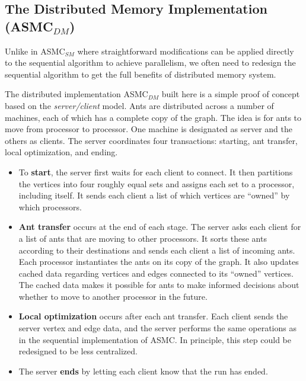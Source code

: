 \documentclass[11pt]{article}
\begin{document}
\subsection{The Distributed Memory Implementation (ASMC$_{DM}$)}\label{ASMC_dist} 

Unlike in ASMC$_{SM}$ where straightforward modifications can be applied directly to the sequential algorithm to achieve parallelism, we often need to redesign the sequential algorithm to get the full benefits of distributed memory system. 

The distributed implementation ASMC$_{DM}$ built here is a simple proof of concept based on the \textit{server/client} model.  Ants are distributed across a number of machines, each of which has a complete copy of the graph.  The idea is for ants to move from processor to processor.  One machine is designated as server and the others as clients.  The server coordinates four transactions: starting, ant transfer, local optimization, and ending.


\begin{itemize}

\item To {\bf start}, the server first waits for each client to connect.  It then partitions the vertices into four roughly equal sets and assigns each set to a processor, including itself.  It sends each client a list of which vertices are ``owned'' by which processors.

\item {\bf Ant transfer} occurs at the end of each stage.  The server asks each client for a list of ants that are moving to other processors.  It sorts these ants according to their destinations and sends each client a list of incoming ants.  Each processor instantiates the ants on its copy of the graph. It also updates cached data regarding vertices and edges connected to its ``owned'' vertices.  The cached data makes it possible for ants to make informed decisions about whether to move to another processor in the future.

\item {\bf Local optimization} occurs after each ant transfer.  Each client sends the server vertex and edge data, and the server performs the same operations as in the sequential implementation of ASMC.  In principle, this step could be redesigned to be less centralized.

\item The server {\bf ends} by letting each client know that the run has ended.  %

\end{itemize}
\end{document}

